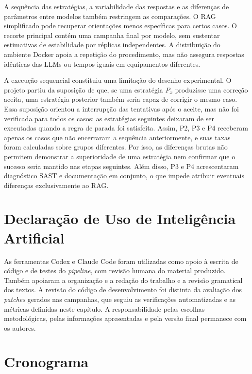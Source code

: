 A sequência das estratégias, a variabilidade das respostas e as diferenças de parâmetros entre modelos também restringem as comparações. O RAG simplificado pode recuperar orientações menos específicas para certos casos. O recorte principal contém uma campanha final por modelo, sem sustentar estimativas de estabilidade por réplicas independentes. A distribuição do ambiente Docker apoia a repetição do procedimento, mas não assegura respostas idênticas das LLMs ou tempos iguais em equipamentos diferentes.

A execução sequencial constituiu uma limitação do desenho experimental. O projeto partiu da suposição de que, se uma estratégia $P_x$ produzisse uma correção aceita, uma estratégia posterior também seria capaz de corrigir o mesmo caso. Essa suposição orientou a interrupção das tentativas após o aceite, mas não foi verificada para todos os casos: as estratégias seguintes deixaram de ser executadas quando a regra de parada foi satisfeita. Assim, P2, P3 e P4 receberam apenas os casos que não encerraram a sequência anteriormente, e suas taxas foram calculadas sobre grupos diferentes. Por isso, as diferenças brutas não permitem demonstrar a superioridade de uma estratégia nem confirmar que o sucesso seria mantido nas etapas seguintes. Além disso, P3 e P4 acrescentaram diagnóstico SAST e documentação em conjunto, o que impede atribuir eventuais diferenças exclusivamente ao RAG.

\section{Declaração de Uso de Inteligência Artificial}
\label{sec:met-ia}

As ferramentas Codex e Claude Code foram utilizadas como apoio à escrita de código e de testes do \textit{pipeline}, com revisão humana do material produzido. Também apoiaram a organização e a redação do trabalho e a revisão gramatical dos textos. A revisão do código de desenvolvimento foi distinta da avaliação dos \textit{patches} gerados nas campanhas, que seguiu as verificações automatizadas e as métricas definidas neste capítulo. A responsabilidade pelas escolhas metodológicas, pelas informações apresentadas e pela versão final permanece com os autores.

\section{Cronograma}
\label{sec:met-cronograma}

